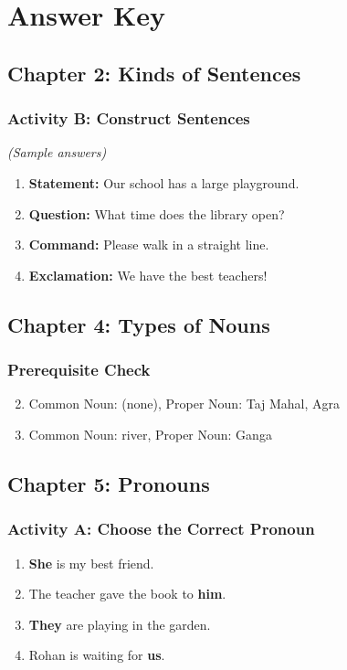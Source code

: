 
\chapter{Answer Key}

\section*{Chapter 2: Kinds of Sentences}
\subsection*{Activity B: Construct Sentences}
\textit{(Sample answers)}
\begin{enumerate}
    \item \textbf{Statement:} Our school has a large playground.
    \item \textbf{Question:} What time does the library open?
    \item \textbf{Command:} Please walk in a straight line.
    \item \textbf{Exclamation:} We have the best teachers!
\end{enumerate}

\section*{Chapter 4: Types of Nouns}
\subsection*{Prerequisite Check}
\begin{enumerate}
    \setcounter{enumi}{1}
    \item Common Noun: (none), Proper Noun: Taj Mahal, Agra
    \item Common Noun: river, Proper Noun: Ganga
\end{enumerate}

\section*{Chapter 5: Pronouns}
\subsection*{Activity A: Choose the Correct Pronoun}
\begin{enumerate}
    \item \textbf{She} is my best friend.
    \item The teacher gave the book to \textbf{him}.
    \item \textbf{They} are playing in the garden.
    \item Rohan is waiting for \textbf{us}.
\end{enumerate}
